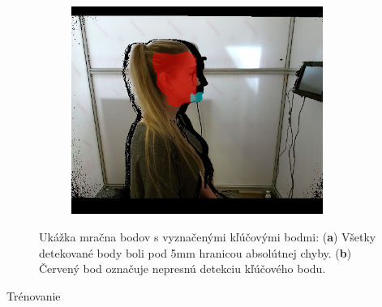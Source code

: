 \begin{figure}[H]
\begin{subfigure}[b]{0.49\textwidth}
		\centering
		\includegraphics[width=0.9\textwidth]{figures/rcnn_detect3.png}
		\caption{}
		\label{fig:rcnn:label:c}
	\end{subfigure}
	\caption{Ukážka mračna bodov s vyznačenými kľúčovými bodmi: (\textbf{a}) Všetky detekované body boli pod 5mm hranicou absolútnej chyby. (\textbf{b}) Červený bod označuje nepresnú detekciu kľúčového bodu.}
	\label{fig:rcnn:label}
\end{figure}


Trénovanie 